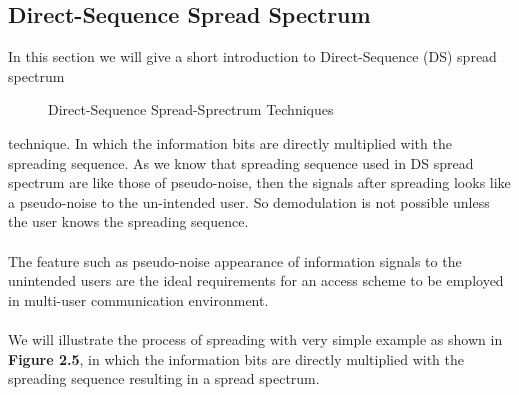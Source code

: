 \subsection{Direct-Sequence Spread Spectrum}
In this section we will give a short introduction to Direct-Sequence (DS) spread spectrum 
\begin{figure}[htb]
  \centerline{  }
  \caption{Direct-Sequence Spread-Sprectrum Techniques}
\end{figure}
technique. In which the information bits are directly multiplied with the spreading sequence. As we know that spreading sequence used in DS spread spectrum are like those of pseudo-noise, then the signals after spreading looks like a pseudo-noise to the un-intended user. So demodulation is not possible unless the user knows the spreading sequence.\\ \\
The feature such as pseudo-noise appearance of information signals to the unintended users are the ideal requirements for an access scheme to be employed in multi-user communication environment. \\ \\
We will illustrate the process of spreading with very simple example as shown in \textbf{Figure 2.5}, in which the information bits are directly multiplied with the spreading sequence resulting in a spread spectrum.
